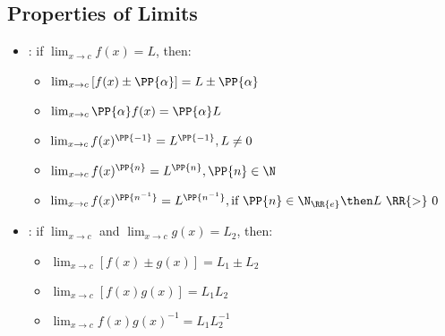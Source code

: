 \begin{itemize}
  \subsection{Properties of Limits}
  \begin{itemize}
    \item {}: if \( \lim_{x \to c} f(x) =
      L\), then:
      \begin{itemize}
        \item \( \lim_{x \to c}\left[ f(x) \pm \PP{ \alpha } \right] = L \pm
          \PP{ \alpha } \)
        \item \( \lim_{x \to c} \PP{ \alpha } f(x) = \PP{
          \alpha }  L \)
        \item \( \lim_{x \to c} f(x)^{\PP{-1}} = L^{\PP{-1}}, L \neq 0 \)
        \item \( \lim_{x \to c} f(x)^{\PP{n}} = L^{\PP{n}}, \PP{n} \in \N \)
        \item \( \lim_{x \to c} f(x)^{\PP{n^{-1}}} = L^{\PP{n^{-1}}},
          \text{if}~\PP{n} \in \N_\RR{e} \then L~\RR{>}~0\)
      \end{itemize}

    \item {}: if \( \lim_{x \to c} \) and
      \( \lim_{x \to c} g(x) = L_2 \), then:
      \begin{itemize}
        \item \( \lim_{x \to c} \left[ f(x) \pm g(x) \right] = L_1 \pm L_2 \)
        \item \( \lim_{x \to c} \left[ f(x)g(x) \right] = L_1 L_2 \)
        \item \( \lim_{x \to c} f(x)g(x)^{-1} = L_1 L_2^{-1} \)
      \end{itemize}


\end{itemize}
\end{itemize}

